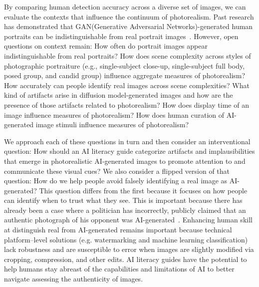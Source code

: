 By comparing human detection accuracy across a diverse set of images, we can evaluate the contexts that influence the continuum of photorealism. Past research has demonstrated that GAN(Generative Adversarial Networks)-generated human portraits can be indistinguishable from real portrait images~\cite{nightingale2022ai}. However, open questions on context remain: How often do portrait images appear indistinguishable from real portraits? How does scene complexity across styles of photographic portraiture (e.g., single-subject close-up, single-subject full body, posed group, and candid group) influence aggregate measures of photorealism? How accurately can people identify real images across scene complexities? What kind of artifacts arise in diffusion model-generated images and how are the presence of those artifacts related to photorealism? How does display time of an image influence measures of photorealism? How does human curation of AI-generated image stimuli influence measures of photorealism?

We approach each of these questions in turn and then consider an interventional question: How should an AI literacy guide categorize artifacts and implausibilities that emerge in photorealistic AI-generated images to promote attention to and communicate these visual cues? We also consider a flipped version of that question: How do we help people avoid falsely identifying a real image as AI-generated? This question differs from the first because it focuses on how people can identify when to trust what they see. This is important because there has already been a case where a politician has incorrectly, publicly claimed that an authentic photograph of his opponent was AI-generated~\cite{apnews2024b, wired2024kamala}. Enhancing human skill at distinguish real from AI-generated remains important because technical platform--level solutions (e.g. watermarking and machine learning classification) lack robustness and are susceptible to error when images are slightly modified via cropping, compression, and other edits. AI literacy guides have the potential to help humans stay abreast of the capabilities and limitations of AI to better navigate assessing the authenticity of images.

